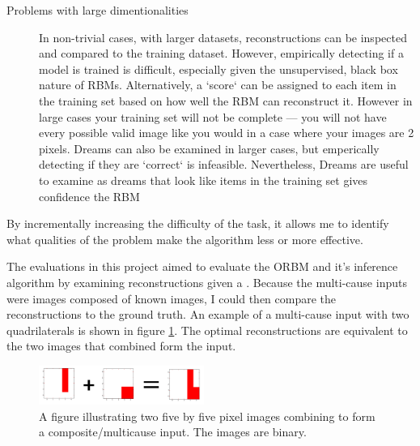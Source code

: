 \begin{description}
  \item[Problems  with large dimentionalities] In non-trivial cases, with larger datasets, reconstructions can be inspected and compared to the training dataset. However, empirically detecting if a model is trained is difficult, especially given the unsupervised, black box nature of RBMs.
  Alternatively, a `score` can be assigned to each item in the training set based on how well the RBM can reconstruct it. However in large cases your training set will not be complete --- you will not have every possible valid image like you would in a case where your images are 2 pixels.
  Dreams can also be examined in larger cases, but emperically detecting if they are `correct` is infeasible. Nevertheless, Dreams are useful to examine as dreams that look like items in the training set gives confidence the RBM 

\end{description}


 By incrementally increasing the difficulty of the task, it allows me to identify what qualities of the problem make the algorithm less or more effective.

The evaluations in this project aimed to evaluate the ORBM and it's inference algorithm by examining reconstructions given a . Because the multi-cause inputs were images composed of known images, I could then compare the reconstructions to the ground truth. An example of a multi-cause input with two quadrilaterals is shown in figure \ref{F:Composite-Example}. The optimal reconstructions are equivalent to the two images that combined form the input.

\begin{figure}
  \begin{center}
    \includegraphics[width=0.48\textwidth]{Assets/Composite-Example.png}
  \end{center}
  \caption{A figure illustrating two five by five pixel images combining to form a composite/multicause input. The images are binary.}
  \label{F:Composite-Example}
\end{figure}

